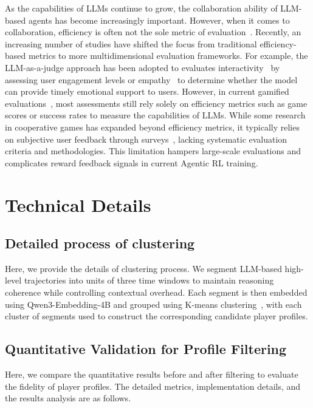 \documentclass{article}
\theoremstyle{plain}
\theoremstyle{definition}
\theoremstyle{remark}
\begin{document}
As the capabilities of LLMs continue to grow, the collaboration ability of LLM-based agents has become increasingly important. However, when it comes to collaboration, efficiency is often not the sole metric of evaluation~\cite{george1990personality,mcallister1995affect,salas2005there}. Recently, an increasing number of studies have shifted the focus from traditional efficiency-based metrics to more multidimensional evaluation frameworks. For example, the LLM-as-a-judge approach has been adopted to evaluates interactivity~\cite{WuGP0LDC0L025} by assessing user engagement levels or empathy~\cite{zhang2025echo} to determine whether the model can provide timely emotional support to users. However, in current gamified evaluations~\cite{costarelli2024gamebench,xi2025agentgym,hu2025lmgame,sun2025collab,zhang2025paracook}, most assessments still rely solely on efficiency metrics such as game scores or success rates to measure the capabilities of LLMs. While some research in cooperative games has expanded beyond efficiency metrics, it typically relies on subjective user feedback through surveys~\cite{SiuPCZLPCA21,ZhangDSZDTSG24}, lacking systematic evaluation criteria and methodologies. This limitation hampers large-scale evaluations and complicates reward feedback signals in current Agentic RL training.















\section{Technical Details}
\subsection{Detailed process of clustering}\label{apx:cluster}
Here, we provide the details of clustering process. We segment LLM-based high-level trajectories into units of three time windows to maintain reasoning coherence while controlling contextual overhead. Each segment is then embedded using Qwen3-Embedding-4B and grouped using K-means clustering~\cite{kmeans}, with each cluster of segments used to construct the corresponding candidate player profiles.
\subsection{Quantitative Validation for Profile Filtering}\label{apx:filter}
Here, we compare the quantitative results before and after filtering to evaluate the fidelity of player profiles. The detailed metrics, implementation details, and the results analysis are as follows.
\end{document}
